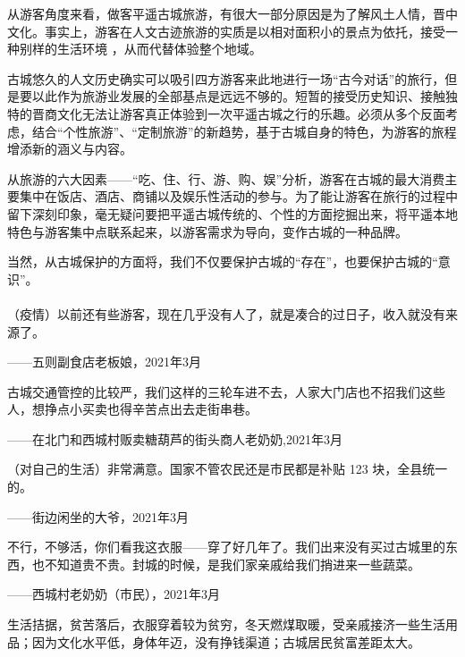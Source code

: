 \documentclass[UTF8]{ctexart}
\begin{document}
从游客角度来看，做客平遥古城旅游，有很大一部分原因是为了解风土人情，晋中文化。事实上，游客在人文古迹旅游的实质是以相对面积小的景点为依托，接受一种别样的生活环境 ，从而代替体验整个地域。

古城悠久的人文历史确实可以吸引四方游客来此地进行一场“古今对话”的旅行，但是要以此作为旅游业发展的全部基点是远远不够的。短暂的接受历史知识、接触独特的晋商文化无法让游客真正体验到一次平遥古城之行的乐趣。必须从多个反面考虑，结合“个性旅游”、“定制旅游”的新趋势，基于古城自身的特色，为游客的旅程增添新的涵义与内容。

从旅游的六大因素——“吃、住、行、游、购、娱”分析，游客在古城的最大消费主要集中在饭店、酒店、商铺以及娱乐性活动的参与。为了能让游客在旅行的过程中留下深刻印象，毫无疑问要把平遥古城传统的、个性的方面挖掘出来，将平遥本地特色与游客集中点联系起来，以游客需求为导向，变作古城的一种品牌。

当然，从古城保护的方面将，我们不仅要保护古城的“存在”，也要保护古城的“意识”。
\\\hspace{\fill}\\

（疫情）以前还有些游客，现在几乎没有人了，就是凑合的过日子，收入就没有来源了。

\begin{flushright}
    ——五则副食店老板娘，2021年3月
\end{flushright}

古城交通管控的比较严，我们这样的三轮车进不去，人家大门店也不招我们这些人，想挣点小买卖也得辛苦点出去走街串巷。

\begin{flushright}
    ——在北门和西城村贩卖糖葫芦的街头商人老奶奶,2021年3月
\end{flushright}

（对自己的生活）非常满意。国家不管农民还是市民都是补贴 123 块，全县统一的。

\begin{flushright}
    ——街边闲坐的大爷，2021年3月
\end{flushright}

不行，不够活，你们看我这衣服——穿了好几年了。我们出来没有买过古城里的东西，也不知道贵不贵。封城的时候，是我们家亲戚给我们捎进来一些蔬菜。
\begin{flushright}
    ——西城村老奶奶（市民），2021年3月
\end{flushright}

生活拮据，贫苦落后，衣服穿着较为贫穷，冬天燃煤取暖，受亲戚接济一些生活用品；因为文化水平低，身体年迈，没有挣钱渠道；古城居民贫富差距太大。
\end{document}
